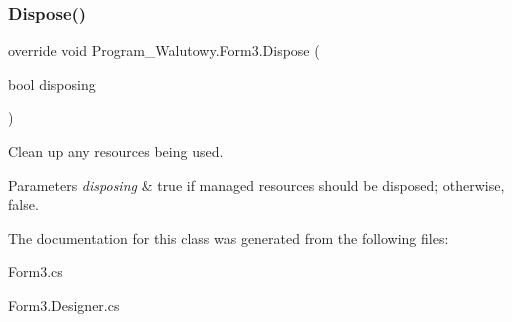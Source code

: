 \subsubsection{\texorpdfstring{Dispose()}{Dispose()}}
{\footnotesize\ttfamily override void Program\+\_\+\+Walutowy.\+Form3.\+Dispose (\begin{DoxyParamCaption}\item[{bool}]{disposing }\end{DoxyParamCaption})\hspace{0.3cm}{\ttfamily [protected]}}



Clean up any resources being used. 


\begin{DoxyParams}{Parameters}
{\em disposing} & true if managed resources should be disposed; otherwise, false.\\
\hline
\end{DoxyParams}


The documentation for this class was generated from the following files\+:\begin{DoxyCompactItemize}
\item 
Form3.\+cs\item 
Form3.\+Designer.\+cs\end{DoxyCompactItemize}
